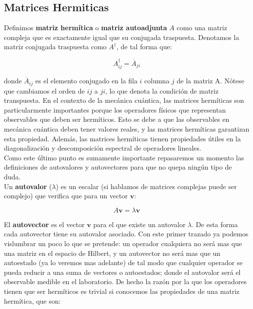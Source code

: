 \documentclass[12pt,a4paper]{article}
\numberwithin{equation}{section}
\numberwithin{figure}{section}
\newcommand{\vn}{\mathbf{v}}
\begin{document}
\subsection{Matrices Hermiticas}

Definimos \textbf{matriz hermítica} o \textbf{matriz autoadjunta} $A$ como una matriz compleja que es exactamente igual que su conjugada traspuesta. Denotamos la matriz conjugada traspuesta como $A^\dagger$, de tal forma que:

\begin{equation}
A^\dagger_{ij} = \overline{A}_{ji}
\end{equation}

donde $\overline{A}_{ij}$ es el elemento conjugado en la fila $i$ columna $j$ de la matriz A. Nótese que cambiamos el orden de $ij$ a $ji$, lo que denota la condición de matriz transpuesta. En el contexto de la mecánica cuántica, las matrices hermíticas son particularmente importantes porque los operadores físicos que representan observables que deben ser hermíticos. Esto se debe a que las observables en mecánica cuántica deben tener valores reales, y las matrices hermíticas garantizan esta propiedad. Además, las matrices hermíticas tienen propiedades útiles en la diagonalización y descomposición espectral de operadores lineales. \\

Como este último punto es sumamente importante repasaremos un momento las definiciones de autovalores y autovectores para que no quepa ningún tipo de duda. \\

Un \textbf{autovalor} ($\lambda$) es un escalar (si hablamos de matrices complejas puede ser complejo) que verifica que para un vector $\vn$:

\begin{equation}
A \vn = \lambda \vn
\end{equation}

El \textbf{autovector} es el vector $\vn$ para el que existe un autovalor $\lambda$.  De esta forma cada autovector tiene su autovalor asociado. Con este primer trazado ya podemos vislumbrar un poco lo que se pretende: un operador cualquiera no será mas que una matriz en el espacio de Hilbert, y un autovector no será mas que un autoestado (ya lo veremos mas adelante) de tal modo que cualquier operador se pueda reducir a una suma de vectores o autoestados; donde el autovalor será el observable medible en el laboratorio. De hecho la razón por la que los operadores tienen que ser hermíticos es trivial si conocemos las propiedades de una matriz hermítica, que son:
\end{document}
